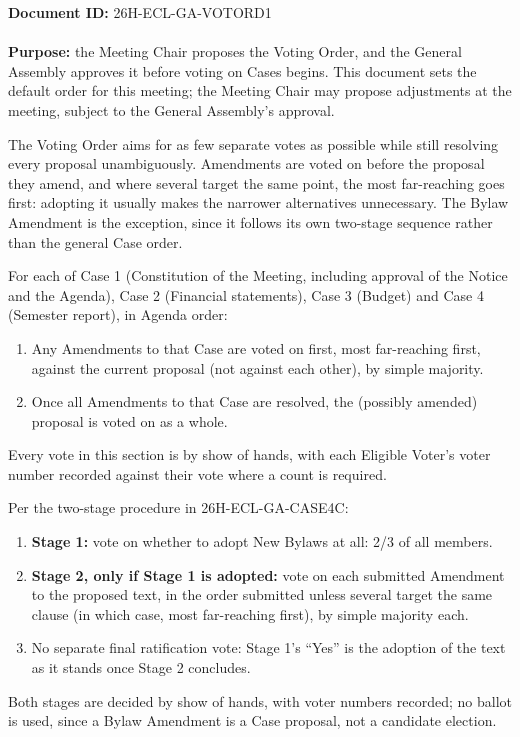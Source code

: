 \documentclass{../../../Common/Latex/Templates/rapport}
\date{\meetingdate, \meetingtime}
\begin{document}
\makecoverpage
\tableofcontents
\reportmainmatter

\noindent\textbf{Document ID:} 26H-ECL-GA-VOTORD1\\
\meetingline\\
\textbf{Purpose:} the Meeting Chair proposes the Voting Order, and the General Assembly approves it before voting on Cases begins. This document sets the default order for this meeting; the Meeting Chair may propose adjustments at the meeting, subject to the General Assembly's approval.

The Voting Order aims for as few separate votes as possible while still resolving every proposal unambiguously. Amendments are voted on before the proposal they amend, and where several target the same point, the most far-reaching goes first: adopting it usually makes the narrower alternatives unnecessary. The Bylaw Amendment is the exception, since it follows its own two-stage sequence rather than the general Case order.

For each of Case 1 (Constitution of the Meeting, including approval of the Notice and the Agenda), Case 2 (Financial statements), Case 3 (Budget) and Case 4 (Semester report), in Agenda order:
\begin{enumerate}
  \item Any Amendments to that Case are voted on first, most far-reaching first, against the current proposal (not against each other), by simple majority.
  \item Once all Amendments to that Case are resolved, the (possibly amended) proposal is voted on as a whole.
\end{enumerate}
Every vote in this section is by show of hands, with each Eligible Voter's voter number recorded against their vote where a count is required.

Per the two-stage procedure in 26H-ECL-GA-CASE4C:
\begin{enumerate}
  \item \textbf{Stage 1:} vote on whether to adopt New Bylaws at all: 2/3 of all members.
  \item \textbf{Stage 2, only if Stage 1 is adopted:} vote on each submitted Amendment to the proposed text, in the order submitted unless several target the same clause (in which case, most far-reaching first), by simple majority each.
  \item No separate final ratification vote: Stage 1's ``Yes'' is the adoption of the text as it stands once Stage 2 concludes.
\end{enumerate}
Both stages are decided by show of hands, with voter numbers recorded; no ballot is used, since a Bylaw Amendment is a Case proposal, not a candidate election.
\end{document}
